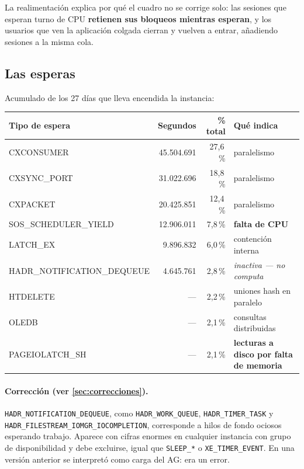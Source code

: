 \documentclass[11pt,a4paper]{article}
\newcommand{\cod}[1]{\texttt{\small #1}}
\newcommand{\critico}[1]{\textcolor{rojo}{\textbf{#1}}}
\newcommand{\sombra}{\cellcolor{grisclaro}}
\begin{document}
La realimentación explica por qué el cuadro no se corrige solo: las sesiones
que esperan turno de CPU \textbf{retienen sus bloqueos mientras esperan}, y
los usuarios que ven la aplicación colgada cierran y vuelven a entrar,
añadiendo sesiones a la misma cola.

\subsection{Las esperas}

Acumulado de los 27 días que lleva encendida la instancia:

\begin{table}[h]
\centering
\small
\begin{tabular}{lrrl}
\toprule
\textbf{Tipo de espera} & \textbf{Segundos} & \textbf{\% total} &
\textbf{Qué indica} \\
\midrule
CXCONSUMER                  & 45.504.691 & 27,6\,\% & paralelismo \\
CXSYNC\_PORT                & 31.022.696 & 18,8\,\% & paralelismo \\
CXPACKET                    & 20.425.851 & 12,4\,\% & paralelismo \\
SOS\_SCHEDULER\_YIELD       & 12.906.011 &  7,8\,\% & \critico{falta de CPU} \\
LATCH\_EX                   &  9.896.832 &  6,0\,\% & contención interna \\
\sombra HADR\_NOTIFICATION\_DEQUEUE & \sombra 4.645.761 & \sombra 2,8\,\% &
  \sombra \emph{inactiva --- no computa} \\
HTDELETE                    & --- &  2,2\,\% & uniones hash en paralelo \\
OLEDB                       & --- &  2,1\,\% & consultas distribuidas \\
PAGEIOLATCH\_SH             & --- &  2,1\,\% & \critico{lecturas a disco por falta de memoria} \\
\bottomrule
\end{tabular}
\end{table}

\paragraph{Corrección (ver \ref{sec:correcciones}).}
\cod{HADR\_NOTIFICATION\_DEQUEUE}, como \cod{HADR\_WORK\_QUEUE},
\cod{HADR\_TIMER\_TASK} y \cod{HADR\_FILESTREAM\_IOMGR\_IOCOMPLETION},
corresponde a hilos de fondo ociosos esperando trabajo. Aparece con cifras
enormes en cualquier instancia con grupo de disponibilidad y debe excluirse,
igual que \cod{SLEEP\_*} o \cod{XE\_TIMER\_EVENT}. En una versión anterior se
interpretó como carga del AG: era un error.
\end{document}

